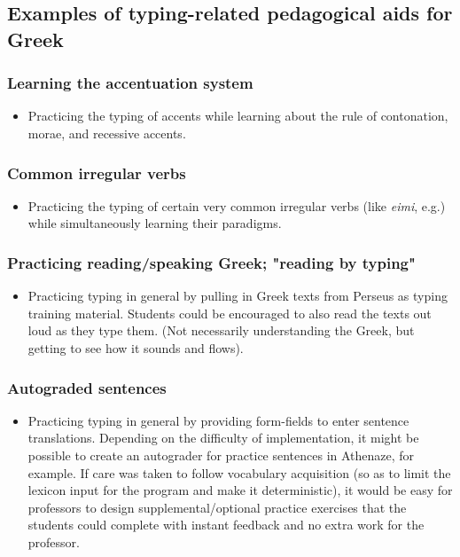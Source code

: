 \documentclass[11pt]{article}
\begin{document}
\subsection{Examples of typing-related pedagogical aids for Greek}
\label{sec:orgcc18527}

\subsubsection{Learning the accentuation system}
\label{sec:org56ac311}

\begin{itemize}
\item Practicing the typing of accents while learning about the rule of contonation, morae, and recessive accents.
\end{itemize}

\subsubsection{Common irregular verbs}
\label{sec:org00afb6d}

\begin{itemize}
\item Practicing the typing of certain very common irregular verbs (like \emph{eimi}, e.g.) while simultaneously learning their paradigms.
\end{itemize}

\subsubsection{Practicing reading/speaking Greek; "reading by typing"}
\label{sec:org9e78627}

\begin{itemize}
\item Practicing typing in general by pulling in Greek texts from Perseus as typing training material. Students could be encouraged to also read the texts out loud as they type them. (Not necessarily understanding the Greek, but getting to see how it sounds and flows).
\end{itemize}

\subsubsection{Autograded sentences}
\label{sec:org4d32a1d}

\begin{itemize}
\item Practicing typing in general by providing form-fields to enter sentence translations. Depending on the difficulty of implementation, it might be possible to create an autograder for practice sentences in Athenaze, for example. If care was taken to follow vocabulary acquisition (so as to limit the lexicon input for the program and make it deterministic), it would be easy for professors to design supplemental/optional practice exercises that the students could complete with instant feedback and no extra work for the professor.
\end{itemize}
\end{document}
